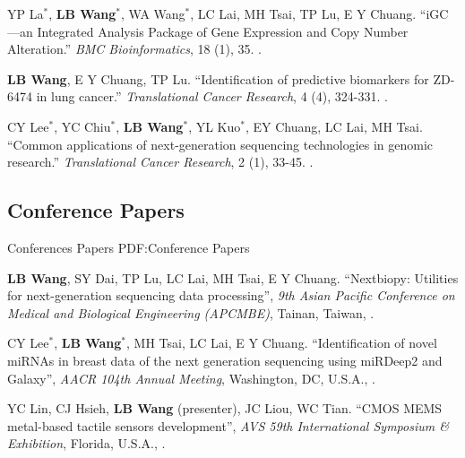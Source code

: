 \documentclass[a4paper,12pt,oneside]{article}
\begin{document}
\begin{body}
\begin{publication}[series=pub, widest*=100]
    \item
        YP La$^*$, \textbf{LB Wang}$^*$, WA Wang$^*$, LC Lai, MH Tsai, TP Lu, E Y Chuang.
        ``iGC—an Integrated Analysis Package of Gene Expression and Copy Number Alteration.''
        \textit{BMC Bioinformatics}, 18 (1), 35.
        .

    \item
        \textbf{LB Wang}, E Y Chuang, TP Lu.
        ``Identification of predictive biomarkers for ZD-6474 in lung cancer.''
        \textit{Translational Cancer Research}, 4 (4), 324-331.
        .

    \item
        CY Lee$^*$, YC Chiu$^*$, \textbf{LB Wang}$^*$, YL Kuo$^*$, EY  Chuang, LC Lai, MH Tsai.
        ``Common applications of next-generation sequencing technologies in genomic research.''
        \textit{Translational Cancer Research}, 2 (1), 33-45.
        .
\end{publication}

\BigEntryGap
\subsection{Conference Papers}
{Conferences Papers}
{PDF:Conference Papers}

\begin{publication}[widest*=100]  %

    \item
        \textbf{LB Wang}, SY Dai, TP Lu, LC Lai, MH Tsai, E Y Chuang.
        ``Nextbiopy: Utilities for next-generation sequencing data processing'',
        \textit{9th Asian Pacific Conference on Medical and Biological Engineering (APCMBE)},
        Tainan, Taiwan,
        .

    \item
        CY Lee$^*$, \textbf{LB Wang}$^*$, MH Tsai, LC Lai, E Y Chuang.
        ``Identification of novel miRNAs in breast data of the next generation sequencing using miRDeep2 and Galaxy'',
        \textit{AACR 104th Annual Meeting},
        Washington, DC, U.S.A.,
        .

    \item
        YC Lin, CJ Hsieh, \textbf{LB Wang} (presenter), JC Liou, WC Tian.
        ``CMOS MEMS metal-based tactile sensors development'',
        \textit{AVS 59th International Symposium \& Exhibition},
        Florida, U.S.A.,
        .


\end{publication}
\end{body}
\end{document}
